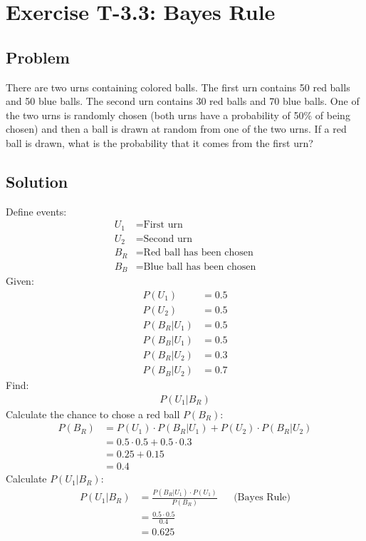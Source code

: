 \section*{Exercise T-3.3: Bayes Rule}

\subsection*{Problem}
There are two urns containing colored balls. The first urn contains 50 red balls and 50 blue balls. The second urn contains 30 red balls and 70 blue balls. One of the two urns is randomly chosen (both urns have a probability of 50\% of being chosen) and then a ball is drawn at random from one of the two urns. If a red ball is drawn, what is the probability that it comes from the first urn?


\subsection*{Solution}
Define events:
\begin{align}
	U_1 &= \text{First urn}\nonumber \\
	U_2 &= \text{Second urn}\nonumber \\
	B_R &= \text{Red ball has been chosen}\nonumber \\
	B_B &= \text{Blue ball has been chosen}\nonumber
\end{align}
Given:
\begin{align}
	P(U_1) &= 0.5 \nonumber \\
	P(U_2) &= 0.5 \nonumber \\
	P(B_R|U_1) &= 0.5 \nonumber \\
	P(B_B|U_1) &= 0.5 \nonumber \\
	P(B_R|U_2) &= 0.3 \nonumber \\
	P(B_B|U_2) &= 0.7 \nonumber
\end{align}
Find:
\begin{align}
P(U_1|B_R) \nonumber
\end{align}
Calculate the chance to chose a red ball $P(B_R)$:
\begin{align}
	P(B_R) &= P(U_1) \cdot P(B_R|U_1) + P(U_2) \cdot P(B_R|U_2)\nonumber\\
	&= 0.5 \cdot 0.5 + 0.5 \cdot 0.3 \nonumber \\
	&= 0.25 + 0.15 \nonumber \\
	&= 0.4 \nonumber 
\end{align}
Calculate $P(U_1|B_R)$:
\begin{align}
P(U_1|B_R) &= \frac{P(B_R|U_1) \cdot  P(U_1)}{P(B_R)} && \text{(Bayes Rule)} \nonumber \\
&= \frac{0.5 \cdot 0.5}{0.4} \nonumber \\
&= 0.625 \nonumber
\end{align}










